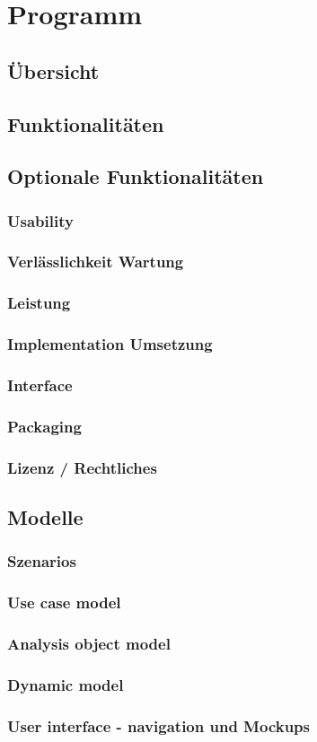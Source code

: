 \part{Programm}
\chapter{Übersicht}
\chapter{Funktionalitäten}
\chapter{Optionale Funktionalitäten}
\section{Usability}
\section{Verlässlichkeit Wartung}
\section{Leistung}
\section{Implementation \/ Umsetzung}
\section{Interface}
\section{Packaging}
\section{Lizenz / Rechtliches}
\chapter{Modelle}
\section{Szenarios}
\section{Use case model}
\section{Analysis object model}
\section{Dynamic model}
\section{User interface - navigation und Mockups}
